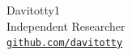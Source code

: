 Davitotty1\\
{\normalsize Independent Researcher}\\
{\normalsize\href{https://github.com/davitotty}{\texttt{github.com/davitotty}}}
